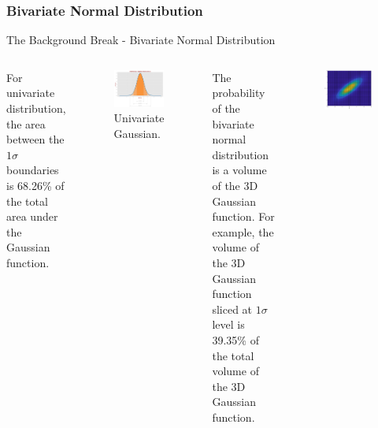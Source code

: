 \subsubsection{Bivariate Normal Distribution}
\begin{frame}{The Background Break - Bivariate Normal Distribution}
\begin{columns}
For univariate distribution, the area between the $1\sigma$ boundaries is 68.26\% of the total area under the Gaussian function.
                \begin{figure}
            \centering
    \includegraphics[width=1\textwidth]{Figures/Background2/UnivariateGaussian.png}
        \vspace{-10pt}
        \caption{Univariate Gaussian.}
    \end{figure}
        The probability of the bivariate normal distribution is a volume of the 3D
Gaussian function. For example, the volume of the 3D Gaussian function sliced at  $1\sigma$ 
level is 39.35\% of the total volume of the 3D Gaussian function.
        \begin{figure}
            \centering
    \includegraphics[width=1\textwidth]{Figures/Background2/GaussianContour_Corr_0.8.eps}

\end{figure}
\end{columns}
\end{frame}
